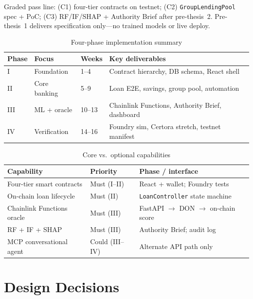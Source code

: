 \documentclass[12pt, a4paper]{report}
\newcommand{\tableheadcolor}{\rowcolor{TableHeadBg}}
\begin{document}
Graded pass line: (C1) four-tier contracts on testnet; (C2) \texttt{GroupLendingPool} spec + PoC; (C3) RF/IF/SHAP + Authority Brief after pre-thesis~2. Pre-thesis~1 delivers specification only---no trained models or live deploy.

\begin{table}[H]
\centering
\caption[Four-phase implementation summary]{Four-phase implementation summary}
\label{tab:phase-summary}
\begin{tabular}{p{1.4cm}p{3.8cm}p{1.6cm}p{6.5cm}}
\toprule
\tableheadcolor
\textbf{Phase} & \textbf{Focus} & \textbf{Weeks} & \textbf{Key deliverables} \\
\midrule
I & Foundation & 1--4 & Contract hierarchy, DB schema, React shell \\
II & Core banking & 5--9 & Loan E2E, savings, group pool, automation \\
III & ML + oracle & 10--13 & Chainlink Functions, Authority Brief, dashboard \\
IV & Verification & 14--16 & Foundry sim, Certora stretch, testnet manifest \\
\bottomrule
\end{tabular}
\end{table}

\begin{table}[H]
\centering
\caption[Core vs.\ optional capabilities]{Core vs.\ optional capabilities}
\label{tab:capability-priority}
\begin{tabular}{p{3.2cm}p{2.2cm}p{7.8cm}}
\toprule
\tableheadcolor
\textbf{Capability} & \textbf{Priority} & \textbf{Phase / interface} \\
\midrule
Four-tier smart contracts & Must (I--II) & React + wallet; Foundry tests \\
On-chain loan lifecycle & Must (II) & \texttt{LoanController} state machine \\
Chainlink Functions oracle & Must (III) & FastAPI $\to$ DON $\to$ on-chain score \\
RF + IF + SHAP & Must (III) & Authority Brief; audit log \\
MCP conversational agent & Could (III--IV) & Alternate API path only \\
\bottomrule
\end{tabular}
\end{table}

\section{Design Decisions}
\label{sec:design-decisions}
\label{sec:gnn-extension}
\label{sec:fl-fraud}
\label{sec:ml-workload}
\end{document}
